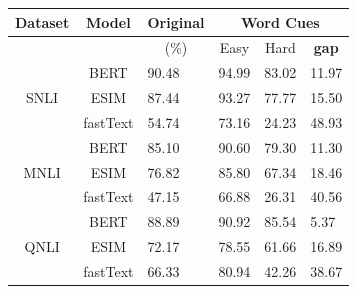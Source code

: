 \begin{table}[th]
\small
\centering
\begin{tabular}{ccllll}
Dataset                                      & \multicolumn{1}{c}{Model} & \multicolumn{1}{c}{Original} & \multicolumn{3}{c}{Word Cues}                                                                                        \\ \hline
                                             &                            & \multicolumn{1}{c}{(\%)}      & \multicolumn{1}{c}{Easy} & \multicolumn{1}{c}{Hard} & \multicolumn{1}{c}{\textbf{gap}} \\ \hline
\multicolumn{1}{c}{\multirow{3}{*}{SNLI}}   & BERT                       & \multicolumn{1}{l}{90.48}    & 94.99                         & 83.02                         & 11.97                         \\
\multicolumn{1}{c}{}                        & ESIM                       & \multicolumn{1}{l}{87.44}    & 93.27                         & 77.77                         & 15.50                         \\
\multicolumn{1}{c}{}                        & fastText                   & \multicolumn{1}{l}{54.74}    & 73.16                         & 24.23                         & 48.93                        \\ \hline
\multicolumn{1}{c}{\multirow{3}{*}{MNLI}}   & BERT                       & \multicolumn{1}{l}{85.10}    & 90.60                         & 79.30                         & 11.30        \\
\multicolumn{1}{c}{}                        & ESIM                       & \multicolumn{1}{l}{76.82}    & 85.80                         & 67.34                         & 18.46                    \\
\multicolumn{1}{c}{}                        & fastText                   & \multicolumn{1}{l}{47.15}    & 66.88                         & 26.31                         & 40.56                    \\ \hline
\multicolumn{1}{c}{\multirow{3}{*}{QNLI}}   & BERT                       & \multicolumn{1}{l}{88.89}    & 90.92                         & 85.54                         & 5.37             \\
\multicolumn{1}{c}{}                        & ESIM                       & \multicolumn{1}{l}{72.17}    & 78.55                         & 61.66                         & 16.89                \\
\multicolumn{1}{c}{}                        & fastText                   & \multicolumn{1}{l}{66.33}    & 80.94                         & 42.26                         & 38.67                 \\ \hline

\end{tabular}
\end{table}
